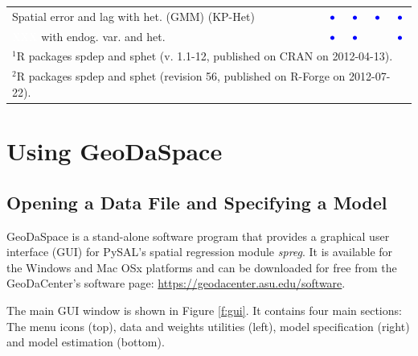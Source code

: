 \documentclass{article}
\begin{document}
\begin{table}[htpb]
\begin{small}
\begin{tabular}{l|cccc}
Spatial error and lag with het. (GMM) (KP-Het)&{\LARGE$\textcolor{blue}\bullet$}&{\LARGE$\textcolor{blue}\bullet$}&{\LARGE$\textcolor{blue}\bullet$}&{\LARGE$\textcolor{blue}\bullet$}\\
\textcolor{white}{XXX} with endog. var. and het. &{\LARGE$\textcolor{blue}\bullet$}&{\LARGE$\textcolor{blue}\bullet$}&&{\LARGE$\textcolor{blue}\bullet$}\\
\hline
\multicolumn{5}{l}{\scriptsize{$^1$R packages spdep and sphet (v. 1.1-12, published on CRAN on 2012-04-13).}} \\
\multicolumn{5}{l}{\scriptsize{$^2$R packages spdep and sphet (revision 56, published on R-Forge on 2012-07-22).}} \\
\end{tabular}
\end{small}
\end{table}


\newpage
\section{Using GeoDaSpace}
\label{s:GS}
\subsection{Opening a Data File and Specifying a Model}

GeoDaSpace is a stand-alone software program that provides a graphical user interface (GUI) for PySAL's spatial regression module  \emph{spreg}. It is available for the Windows and Mac OSx platforms and can be downloaded for free from the GeoDaCenter's software page: \url{https://geodacenter.asu.edu/software}. 

The main GUI window is shown in Figure \ref{f:gui}. It contains four main sections: The menu icons (top), data and weights utilities (left), model specification (right) and model estimation (bottom). 
\end{document}
